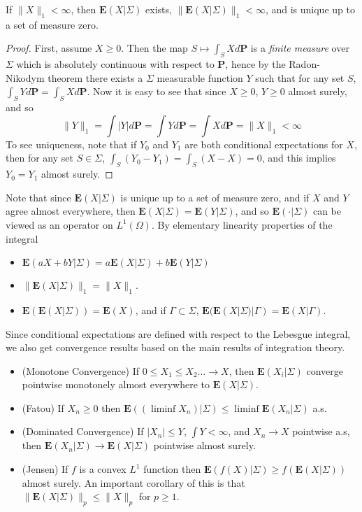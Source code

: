 \begin{theorem}
    If $\|X\|_1 < \infty$, then $\mathbf{E}(X|\Sigma)$ exists, $\| \mathbf{E}(X|\Sigma) \|_1 < \infty$, and is unique up to a set of measure zero.
\end{theorem}
\begin{proof}
    First, assume $X \geq 0$. Then the map $S \mapsto \int_S X d \mathbf{P}$ is a {\it finite measure} over $\Sigma$ which is absolutely continuous with respect to $\mathbf{P}$, hence by the Radon-Nikodym theorem there exists a $\Sigma$ measurable function $Y$ such that for any set $S$, $\int_S Y d\mathbf{P} = \int_S X d\mathbf{P}$. Now it is easy to see that since $X \geq 0$, $Y \geq 0$ almost surely, and so
    \[ \| Y \|_1 = \int |Y| d\mathbf{P} = \int Yd\mathbf{P} = \int Xd\mathbf{P} = \| X \|_1 < \infty \]
    To see uniqueness, note that if $Y_0$ and $Y_1$ are both conditional expectations for $X$, then for any set $S \in \Sigma$, $\int_S (Y_0 - Y_1) = \int_S (X - X) = 0$, and this implies $Y_0 = Y_1$ almost surely.
\end{proof}

Note that since $\mathbf{E}(X|\Sigma)$ is unique up to a set of measure zero, and if $X$ and $Y$ agree almost everywhere, then $\mathbf{E}(X|\Sigma) = \mathbf{E}(Y|\Sigma)$, and so $\mathbf{E}(\cdot | \Sigma)$ can be viewed as an operator on $L^1(\Omega)$. By elementary linearity properties of the integral
%
\begin{itemize}
    \item $\mathbf{E}(aX + bY|\Sigma) = a \mathbf{E}(X|\Sigma) + b \mathbf{E}(Y|\Sigma)$
    \item $\| \mathbf{E}(X|\Sigma) \|_1 = \| X \|_1$.
    \item $\mathbf{E}(\mathbf{E}(X|\Sigma)) = \mathbf{E}(X)$, and if $\Gamma \subset \Sigma$, $\mathbf{E}(\mathbf{E}(X|\Sigma)|\Gamma) = \mathbf{E}(X|\Gamma)$.
\end{itemize}
%
Since conditional expectations are defined with respect to the Lebesgue integral, we also get convergence results based on the main results of integration theory.
%
\begin{itemize}
    \item (Monotone Convergence) If $0 \leq X_1 \leq X_2 \dots \to X$, then $\mathbf{E}(X_i|\Sigma)$ converge pointwise monotonely almost everywhere to $\mathbf{E}(X|\Sigma)$.
    \item (Fatou) If $X_n \geq 0$ then $\mathbf{E}((\liminf X_n)|\Sigma) \leq \liminf \mathbf{E}(X_n|\Sigma)$ a.s.
    \item (Dominated Convergence) If $|X_n| \leq Y$, $\int Y < \infty$, and $X_n \to X$ pointwise a.s, then $\mathbf{E}(X_n|\Sigma) \to \mathbf{E}(X|\Sigma)$ pointwise almost surely.
    \item (Jensen) If $f$ is a convex $L^1$ function then $\mathbf{E}(f(X)|\Sigma) \geq f(\mathbf{E}(X|\Sigma))$ almost surely. An important corollary of this is that $\| \mathbf{E}(X|\Sigma) \|_p \leq \| X \|_p$ for $p \geq 1$.
\end{itemize}

